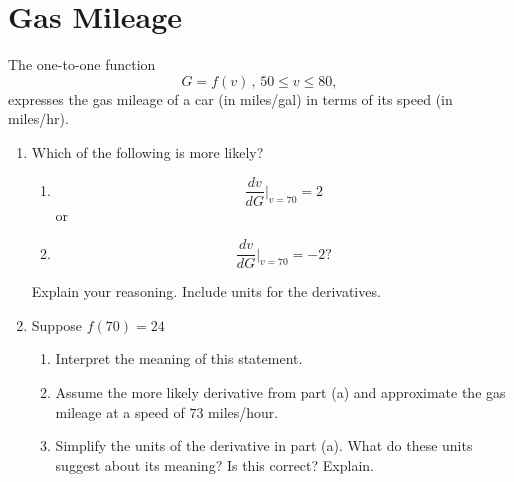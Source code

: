 \documentclass{ximera}
\begin{document}
\section{Gas Mileage}
\begin{example} \label{ExPOMPEOEERE}
The one-to-one function
\[
  G =f(v) \, , \, 50 \leq v \leq 80 ,
\] 
expresses the gas mileage of a car (in miles/gal)  in terms of its speed (in miles/hr).

\begin{enumerate}
\item Which of the following is more likely?
\begin{enumerate}
\item
\[
      \frac{dv}{dG}\Big|_{v=70} = 2
\]
or 
\item
\[
      \frac{dv}{dG}\Big|_{v=70} = -2 ?
\]
\end{enumerate}
Explain your reasoning. Include units for the derivatives.

\item Suppose $f(70)=24$

\begin{enumerate}
\item Interpret the meaning of this statement.

\item Assume the more likely derivative from part (a) and approximate the gas mileage at a speed of $73$ miles/hour.

\item Simplify the units of the derivative in part (a). What do these units suggest about its meaning? Is this correct? Explain.
\end{enumerate}
\end{enumerate}




\end{example}
\end{document}
